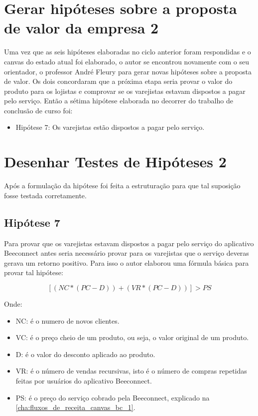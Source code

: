 \section{Gerar hipóteses sobre a proposta de valor da empresa 2}
\label{cha:gerar_hipoteses_ 2}
Uma vez que as seis hipóteses elaboradas no ciclo anterior foram respondidas e o canvas do estado atual foi elaborado, o autor se encontrou novamente com o seu orientador, o professor André Fleury para gerar novas hipóteses sobre a proposta de valor. Os dois concordaram que a próxima etapa seria provar o valor do produto para os lojistas e comprovar se os varejistas estavam dispostos a pagar pelo serviço. Então a sétima hipótese elaborada no decorrer do trabalho de conclusão de curso foi:
\begin{itemize}
\item Hipótese 7: Os varejistas estão dispostos a pagar pelo serviço.
\end{itemize}


\section{Desenhar Testes de Hipóteses 2}
\label{cha:desenhar_hipoteses_2}
Após a formulação da hipótese foi feita a estruturação para que tal suposição fosse testada corretamente.

\subsection{Hipótese 7}
\label{cha:hipotese_7}
Para provar que os varejistas estavam dispostos a pagar pelo serviço do aplicativo Beeconnect antes seria necessário provar para os varejistas que o serviço deveras gerava um retorno positivo. Para isso o autor elaborou uma fórmula básica para provar tal hipótese:

\[[(NC * (PC - D)) + (VR * (PC - D))] > PS\]

Onde: 
\begin{itemize}
\item NC: é o numero de novos clientes.
\item VC: é o preço cheio de um produto, ou seja, o valor original de um produto.
\item D: é o valor do desconto aplicado ao produto.
\item VR: é o número de vendas recursivas, isto é o número de compras repetidas feitas por usuários do aplicativo Beeconnect.
\item PS: é o preço do serviço cobrado pela Beeconnect, explicado na \autoref{cha:fluxos_de_receita_canvas_bc_1}.
\end{itemize}

